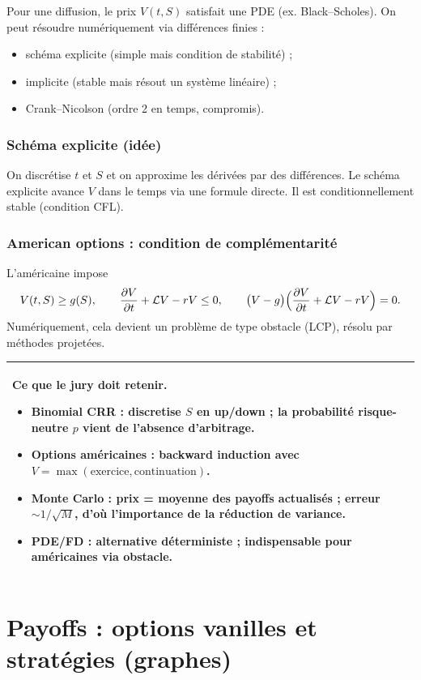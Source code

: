 \documentclass[11pt,a4paper]{report}
\newcommand{\1}{\mathbbm{1}}
\newcommand{\pd}[2]{\frac{\partial #1}{\partial #2}}
\theoremstyle{definition}
\theoremstyle{plain}
\theoremstyle{remark}
\newenvironment{jurybox}{%
  \begin{center}
  \setlength{\tabcolsep}{6pt}%
  \renewcommand{\arraystretch}{1.1}%
  \begin{tabular}{|p{0.94\textwidth}|}
  \hline
  \small\textbf{Ce que le jury doit retenir.}\par\medskip
}{%
  \\ \hline
  \end{tabular}
  \end{center}
}
\begin{document}
Pour une diffusion, le prix $V(t,S)$ satisfait une PDE (ex. Black--Scholes).
On peut résoudre numériquement via différences finies :
\begin{itemize}
  \item schéma explicite (simple mais condition de stabilité) ;
  \item implicite (stable mais résout un système linéaire) ;
  \item Crank--Nicolson (ordre 2 en temps, compromis).
\end{itemize}

\subsection{Schéma explicite (idée)}
On discrétise $t$ et $S$ et on approxime les dérivées par des différences.
Le schéma explicite avance $V$ dans le temps via une formule directe.
Il est conditionnellement stable (condition CFL).

\subsection{American options : condition de complémentarité}
L'américaine impose
\[
V(t,S)\ge g(S),\qquad
\pd{V}{t}+\mathcal{L}V-rV \le 0,\qquad
\bigl(V-g\bigr)\Bigl(\pd{V}{t}+\mathcal{L}V-rV\Bigr)=0.
\]
Numériquement, cela devient un problème de type obstacle (LCP), résolu par méthodes projetées.

\begin{jurybox}
\begin{itemize}
\item Binomial CRR : discretise $S$ en up/down ; la probabilité risque-neutre $p$ vient de l'absence d'arbitrage.
\item Options américaines : backward induction avec $V=\max(\text{exercice},\text{continuation})$.
\item Monte Carlo : prix = moyenne des payoffs actualisés ; erreur $\sim 1/\sqrt{M}$, d'où l'importance de la réduction de variance.
\item PDE/FD : alternative déterministe ; indispensable pour américaines via obstacle.
\end{itemize}
\end{jurybox}

\chapter{Payoffs : options vanilles et stratégies (graphes)}
\label{app:payoffs}
\end{document}
